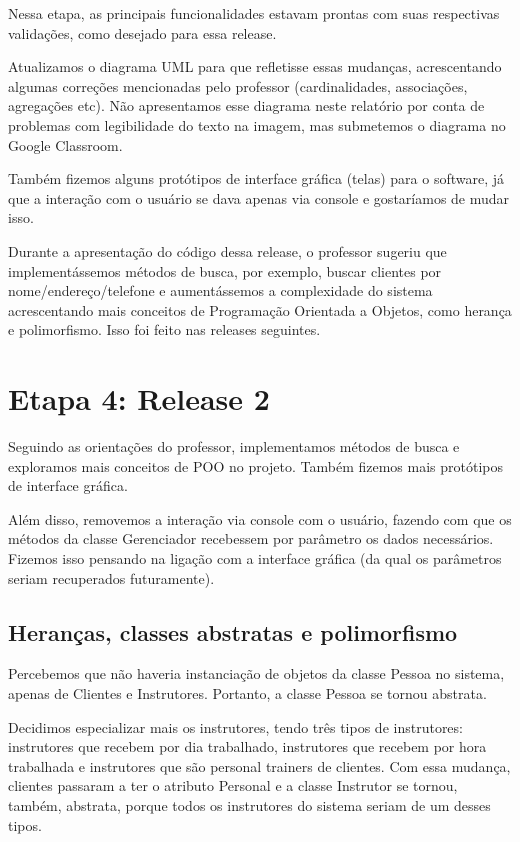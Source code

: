 \documentclass[11pt,twoside]{article}
\begin{document}
Nessa etapa, as principais funcionalidades estavam prontas com suas respectivas validações, como desejado para essa release.

Atualizamos o diagrama UML para que refletisse essas mudanças, acrescentando algumas correções mencionadas
pelo professor (cardinalidades, associações, agregações etc). Não apresentamos esse diagrama neste relatório por conta de
problemas com legibilidade do texto na imagem, mas submetemos o diagrama no Google Classroom.

Também fizemos alguns protótipos de interface gráfica (telas) para o software, já que a interação com o usuário se dava apenas via console e
gostaríamos de mudar isso.

Durante a apresentação do código dessa release, o professor sugeriu que implementássemos métodos de busca, por exemplo, buscar clientes por nome/endereço/telefone e
aumentássemos a complexidade do sistema acrescentando mais conceitos de Programação Orientada a Objetos, como herança e
polimorfismo. Isso foi feito nas releases seguintes.

\section{Etapa 4: Release 2}
Seguindo as orientações do professor, implementamos métodos de busca e exploramos mais conceitos de POO no projeto. Também
fizemos mais protótipos de interface gráfica.

Além disso, removemos a interação via console com o usuário, fazendo com que os métodos da classe Gerenciador recebessem por
parâmetro os dados necessários. Fizemos isso pensando na ligação com a interface gráfica (da qual os parâmetros seriam
recuperados futuramente).
\subsection{Heranças, classes abstratas e polimorfismo}
Percebemos que não haveria instanciação de objetos da classe Pessoa no sistema, apenas de Clientes e Instrutores. Portanto, a classe
Pessoa se tornou abstrata.

Decidimos especializar mais os instrutores, tendo três tipos de instrutores: instrutores que recebem por dia trabalhado, instrutores que
recebem por hora trabalhada e instrutores que são personal trainers de clientes. Com essa mudança, clientes passaram a ter o atributo
Personal e a classe Instrutor se tornou, também, abstrata, porque todos os instrutores do sistema seriam de um desses tipos.
\end{document}
